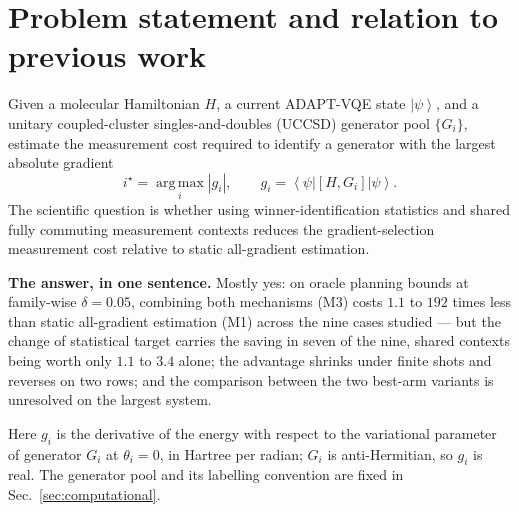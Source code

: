 \documentclass[10pt]{article}
\newcommand{\ket}[1]{\left|#1\right\rangle}
\newcommand{\bra}[1]{\left\langle#1\right|}
\newcommand{\comm}[2]{\left[#1,#2\right]}
\newcommand{\argmax}{\operatorname*{arg\,max}}
\begin{document}
\begin{abstract}
\textbf{Scope.} Every number is a single-ADAPT-step diagnostic for one fixed state, and counts shots only: circuit depth, the number of distinct measurement settings, and state-preparation cost are excluded (Sec.~\ref{sec:assumptions}). Part III symmetry filtering and tapering are not included in the Part I tables; Part III supplies a smaller input problem to the same measurement methods. The revision history of this document, the naming convention for code and files, and the implementation status are in Apps.~\ref{app:revision}--\ref{app:status}.
\end{abstract}

\section{Problem statement and relation to previous work}
\label{sec:problem}

Given a molecular Hamiltonian $H$, a current ADAPT-VQE state $\ket{\psi}$, and a unitary coupled-cluster singles-and-doubles (UCCSD) generator pool $\{G_i\}$, estimate the measurement cost required to identify a generator with the largest absolute gradient
\begin{equation}
  i^\star = \argmax_i |g_i|,
  \qquad
  g_i = \bra{\psi}\comm{H}{G_i}\ket{\psi} .
  \label{eq:gradient}
\end{equation}
The scientific question is whether using winner-identification statistics and shared fully commuting measurement contexts reduces the gradient-selection measurement cost relative to static all-gradient estimation.

\textbf{The answer, in one sentence.} Mostly yes: on oracle planning bounds at family-wise $\delta=0.05$, combining both mechanisms (M3) costs $1.1$ to $192$ times less than static all-gradient estimation (M1) across the nine cases studied --- but the change of statistical target carries the saving in seven of the nine, shared contexts being worth only $1.1$ to $3.4$ alone; the advantage shrinks under finite shots and reverses on two rows; and the comparison between the two best-arm variants is unresolved on the largest system.

Here $g_i$ is the derivative of the energy with respect to the variational parameter of generator $G_i$ at $\theta_i=0$, in Hartree per radian; $G_i$ is anti-Hermitian, so $g_i$ is real. The generator pool and its labelling convention are fixed in Sec.~\ref{sec:computational}.
\end{document}
